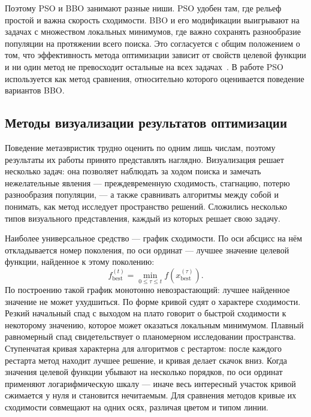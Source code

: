 \documentclass[14pt, a4paper]{extarticle}
\begin{document}
Поэтому PSO и BBO занимают разные ниши. PSO удобен там, где рельеф простой и важна
скорость сходимости. BBO и его модификации выигрывают на задачах с множеством
локальных минимумов, где важно сохранять разнообразие популяции на протяжении
всего поиска. Это согласуется с общим положением о том, что эффективность метода
оптимизации зависит от свойств целевой функции и ни один метод не превосходит
остальные на всех задачах~\cite{ostroukh2018}. В работе PSO используется как метод
сравнения, относительно которого оценивается поведение вариантов BBO.

\subsection{Методы визуализации результатов оптимизации}
\label{subsec:visual-methods}

Поведение метаэвристик трудно оценить по одним лишь числам, поэтому результаты
их работы принято представлять наглядно. Визуализация решает несколько задач:
она позволяет наблюдать за ходом поиска и замечать нежелательные явления ---
преждевременную сходимость, стагнацию, потерю разнообразия популяции, ---
а также сравнивать алгоритмы между собой и понимать, как метод исследует
пространство решений. Сложились несколько типов визуального
представления, каждый из которых решает свою задачу.

Наиболее универсальное средство --- график сходимости. По оси абсцисс на нём
откладывается номер поколения, по оси ординат --- лучшее значение целевой
функции, найденное к этому поколению:
\begin{equation}\label{eq:convergence}
  f_{\text{best}}^{(t)} = \min_{0 \leq \tau \leq t}
  f\!\left(x_{\text{best}}^{(\tau)}\right).
\end{equation}
По построению такой график монотонно невозрастающий: лучшее найденное значение
не может ухудшиться. По форме кривой судят о характере сходимости. Резкий
начальный спад с выходом на плато говорит о быстрой сходимости к некоторому
значению, которое может оказаться локальным минимумом. Плавный равномерный спад
свидетельствует о планомерном исследовании пространства. Ступенчатая кривая
характерна для алгоритмов с рестартом: после каждого рестарта метод находит
лучшее решение, и кривая делает скачок вниз. Когда значения целевой функции
убывают на несколько порядков, по оси ординат применяют логарифмическую шкалу ---
иначе весь интересный участок кривой сжимается у нуля и становится нечитаемым.
Для сравнения методов кривые их сходимости совмещают на одних осях, различая
цветом и типом линии.
\end{document}
